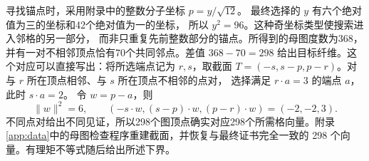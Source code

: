 寻找锚点时，采用附录中的整数分子坐标 $p=y/\sqrt{12}$。
最终选择的 $y$ 有六个绝对值为三的坐标和42个绝对值为一的坐标，
所以 $y^2=96$。这种奇坐标类型使搜索进入邻格的另一部分，
而非只重复先前整数部分的锚点。所得到的母图度数为368，
并有一对不相邻顶点恰有70个共同邻点。差值 \(368-70=298\)
给出目标纤维。这个对应可以直接写出：将所选端点记为 $r,s$，取截面
$T=(-s,s-p,p-r)$。对与 $r$ 所在顶点相邻、与 $s$ 所在顶点不相邻的点对，
选择满足 $r\cdot a=3$ 的端点 $a$，此时 $s\cdot a=2$。
令 $w=p-a$，则
\[
\|w\|^2=6,\qquad (-s\cdot w,(s-p)\cdot w,(p-r)\cdot w)=(-2,-2,3).
\]
不同点对给出不同见证，所以298个图顶点确实对应298个所需格向量。附录\ref{app:data}中的母图检查程序重建截面，并恢复与最终证书完全一致的
298 个向量。有理矩不等式随后给出所述下界。
